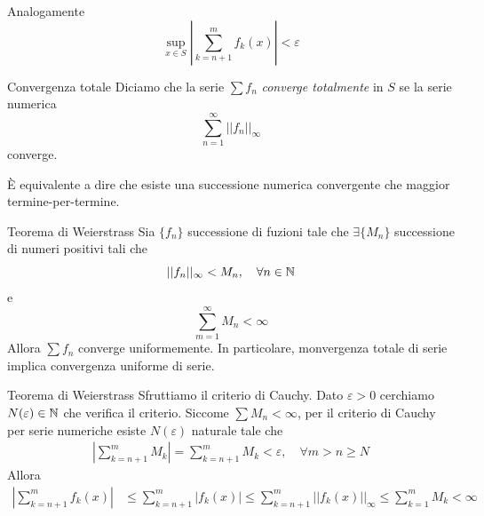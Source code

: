\documentclass[a4paper]{article}
\begin{document}
Analogamente
\[
    \sup_{x \in S} \left|
        \sum_{k=n+1}^m f_k(x)
    \right| < \varepsilon
\]

\begin{snippetdefinition}{Convergenza totale}
    Diciamo che la serie \(\sum f_n\) \emph{converge totalmente}
    in \(S\) se la serie numerica
    \[
        \sum_{n=1}^\infty ||f_n||_\infty
    \]
    converge.
\end{snippetdefinition}

È equivalente a dire che esiste una successione numerica convergente che maggior termine-per-termine.

\begin{snippettheorem}{Teorema di Weierstrass}
    Sia \(\{f_n\}\) successione di fuzioni tale che \(\exists \{M_n\}\)
    successione di numeri positivi tali che
    \[
        ||f_n||_\infty < M_n, \quad \forall n \in \mathbb{N}
    \]
    e \[
        \sum_{m=1}^\infty M_n < \infty
    \]
    Allora \(\sum f_n\) converge uniformemente.
    In particolare, monvergenza totale di serie implica convergenza uniforme di serie.
\end{snippettheorem}

\begin{snippetproof}{Teorema di Weierstrass}
    Sfruttiamo il criterio di Cauchy.
    Dato \(\varepsilon > 0\) cerchiamo \(N(\varepsilon) \in \mathbb{N}\)
    che verifica il criterio.
    Siccome \(\sum M_n < \infty\), per il criterio di Cauchy
    per serie numeriche esiste \(N(\varepsilon)\) naturale tale che
    \begin{align*}
        \left|
            \sum_{k=n+1}^m M_k
        \right|
        = \sum_{k=n+1}^m M_k < \varepsilon, \quad \forall m > n \geq N
    \end{align*}
    Allora
    \begin{align*}
        \left|
            \sum_{k=n+1}^m f_k(x)
        \right| &\leq \sum_{k=n+1}^m |f_k(x)| \leq \sum_{k=n+1}^m ||f_k(x)||_\infty
        \leq \sum_{k=1}^m M_k < \infty
    \end{align*}
\end{snippetproof}
\end{document}
